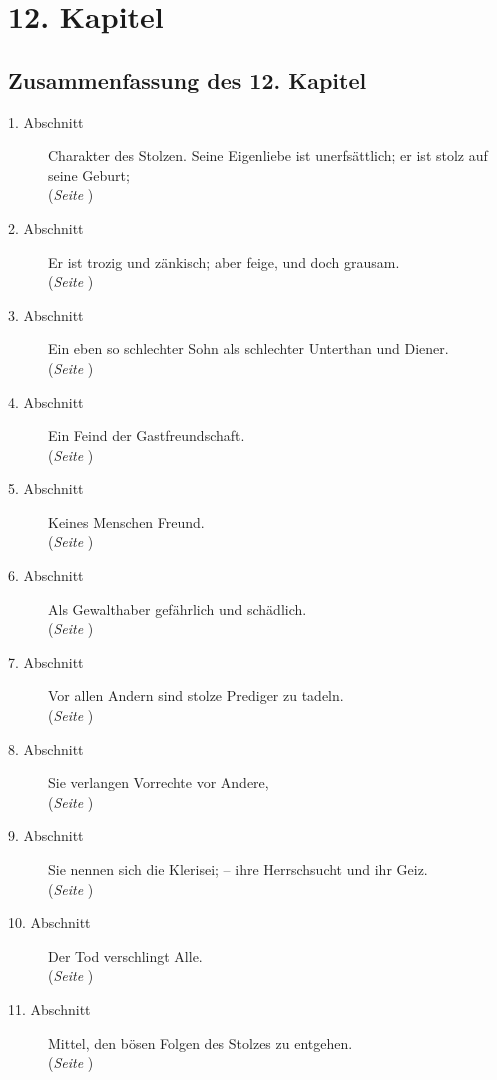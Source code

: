 
\chapter{12. Kapitel} \label{kap12}

\section{Zusammenfassung des 12. Kapitel}
\footnotesize
\begin{description}
\item[1. Abschnitt] Charakter des Stolzen. Seine Eigenliebe ist unerfsättlich;
er
ist stolz auf seine Geburt;
\\(\textit{Seite \pageref{kap12_ab1}})
\item[2. Abschnitt] Er ist trozig und zänkisch; aber feige, und doch grausam.
\\(\textit{Seite \pageref{kap12_ab2}})
\item[3. Abschnitt] Ein eben so schlechter Sohn als schlechter Unterthan und
Diener.
\\(\textit{Seite \pageref{kap12_ab3}})
\item[4. Abschnitt] Ein Feind der Gastfreundschaft.
\\(\textit{Seite \pageref{kap12_ab4}})
\item[5. Abschnitt] Keines Menschen Freund.
\\(\textit{Seite \pageref{kap12_ab5}})
\item[6. Abschnitt] Als Gewalthaber gefährlich und schädlich.
\\(\textit{Seite \pageref{kap12_ab6}})
\item[7. Abschnitt] Vor allen Andern sind stolze Prediger zu tadeln.
\\(\textit{Seite \pageref{kap12_ab7}})
\item[8. Abschnitt] Sie verlangen Vorrechte vor Andere,
\\(\textit{Seite \pageref{kap12_ab8}})
\item[9. Abschnitt] Sie nennen sich die Klerisei; -- ihre Herrschsucht und ihr
Geiz.
\\(\textit{Seite \pageref{kap12_ab9}})
\item[10. Abschnitt] Der Tod verschlingt Alle.
\\(\textit{Seite \pageref{kap12_ab10}})
\item[11. Abschnitt] Mittel, den bösen Folgen des Stolzes zu entgehen.
\\(\textit{Seite \pageref{kap12_ab11}})
\end{description}
\normalsize

